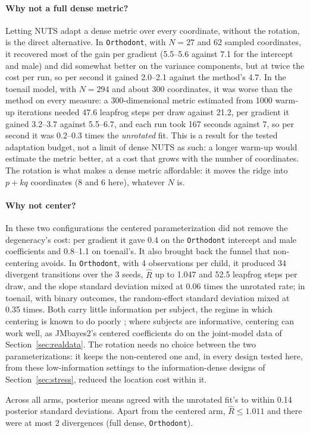 \paragraph{Why not a full dense metric?} Letting NUTS adapt a dense metric
over every coordinate, without the rotation, is the direct alternative. In
\texttt{Orthodont}, with $N = 27$ and 62 sampled coordinates, it recovered
most of the gain per gradient (5.5--5.6 against 7.1 for the intercept and
male) and did somewhat better on the variance components, but at twice the
cost per run, so per second it gained 2.0--2.1 against the method's 4.7.
In the toenail model, with $N = 294$ and about 300 coordinates, it was worse than the method on every measure: a 300-dimensional metric estimated from 1000
warm-up iterations needed 47.6 leapfrog steps per draw against 21.2, per
gradient it gained 3.2--3.7 against 5.5--6.7, and each run took 167
seconds against 7, so per second it was 0.2--0.3 times the \emph{unrotated}
fit. This is a result for the tested adaptation budget, not a limit of dense
NUTS as such: a longer warm-up would estimate the metric better, at a
cost that grows with the number of coordinates. The rotation is what makes a
dense metric affordable: it moves the ridge into $p + kq$ coordinates (8 and
6 here), whatever $N$ is.

\paragraph{Why not center?} In these two configurations the centered
parameterization did not remove the degeneracy's cost: per gradient it gave 0.4 on the
\texttt{Orthodont} intercept and male coefficients and 0.8--1.1 on toenail's.
It also brought back the funnel that non-centering avoids. In
\texttt{Orthodont}, with 4 observations per child, it produced 34
divergent transitions over the 3 seeds, $\hat R$ up to 1.047 and 52.5
leapfrog steps per draw, and the slope standard deviation mixed at 0.06
times the unrotated rate; in toenail, with binary outcomes, the random-effect
standard deviation mixed at 0.35 times. Both carry little information per
subject, the regime in which centering is known to do poorly
\citep{gelfand1995,browne2009}; where subjects are informative, centering
can work well, as JMbayes2's centered coefficients do on the joint-model data
of Section~\ref{sec:realdata}. The rotation needs no choice between the two parameterizations: it keeps the non-centered one and, in every design tested here, from these low-information settings to the information-dense designs of Section~\ref{sec:stress}, reduced the location cost within it.

Across all arms, posterior means agreed with the unrotated fit's to within
0.14 posterior standard deviations. Apart from the centered arm, $\hat R
\leq 1.011$ and there were at most 2 divergences (full dense, \texttt{Orthodont}).
